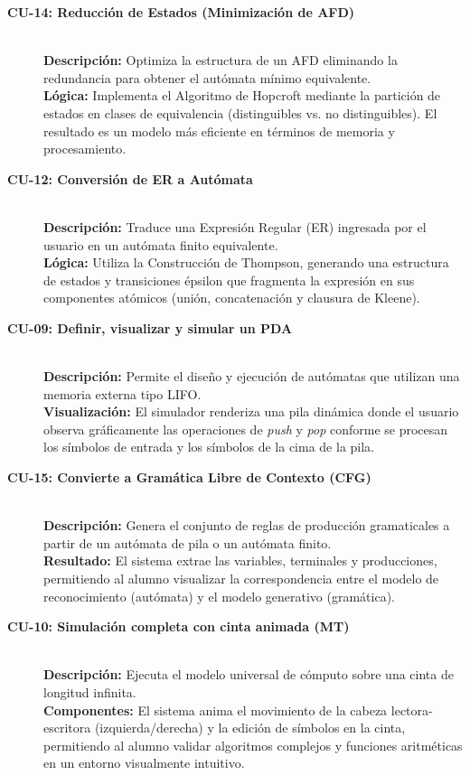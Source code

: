 \begin{description}
    \item[\textbf{CU-14: Reducción de Estados (Minimización de AFD)}]~\\
    \textbf{Descripción:} Optimiza la estructura de un AFD eliminando la redundancia para obtener el autómata mínimo equivalente.\\
    \textbf{Lógica:} Implementa el Algoritmo de Hopcroft mediante la partición de estados en clases de equivalencia (distinguibles vs. no distinguibles). El resultado es un modelo más eficiente en términos de memoria y procesamiento.

    \item[\textbf{CU-12: Conversión de ER a Autómata}]~\\
    \textbf{Descripción:} Traduce una Expresión Regular (ER) ingresada por el usuario en un autómata finito equivalente.\\
    \textbf{Lógica:} Utiliza la Construcción de Thompson, generando una estructura de estados y transiciones épsilon que fragmenta la expresión en sus componentes atómicos (unión, concatenación y clausura de Kleene).

    \item[\textbf{CU-09: Definir, visualizar y simular un PDA}]~\\
    \textbf{Descripción:} Permite el diseño y ejecución de autómatas que utilizan una memoria externa tipo LIFO.\\
    \textbf{Visualización:} El simulador renderiza una pila dinámica donde el usuario observa gráficamente las operaciones de \textit{push} y \textit{pop} conforme se procesan los símbolos de entrada y los símbolos de la cima de la pila.

    \item[\textbf{CU-15: Convierte a Gramática Libre de Contexto (CFG)}]~\\
    \textbf{Descripción:} Genera el conjunto de reglas de producción gramaticales a partir de un autómata de pila o un autómata finito.\\
    \textbf{Resultado:} El sistema extrae las variables, terminales y producciones, permitiendo al alumno visualizar la correspondencia entre el modelo de reconocimiento (autómata) y el modelo generativo (gramática).

    \item[\textbf{CU-10: Simulación completa con cinta animada (MT)}]~\\
    \textbf{Descripción:} Ejecuta el modelo universal de cómputo sobre una cinta de longitud infinita.\\
    \textbf{Componentes:} El sistema anima el movimiento de la cabeza lectora-escritora (izquierda/derecha) y la edición de símbolos en la cinta, permitiendo al alumno validar algoritmos complejos y funciones aritméticas en un entorno visualmente intuitivo.
\end{description}

